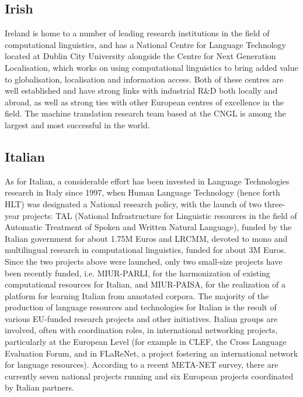 \documentclass[10pt, plain]{../../metanetpaper}
\begin{document}
\begin{multicols}{2}
\begin{small}
\subsection*{Irish}
\label{sec:irish}

Ireland is home to a number of leading research institutions in the field of computational linguistics, and has a National Centre for Language Technology located at Dublin City University alongside the Centre for Next Generation Localisation, which works on using computational linguistics to bring added value to globalisation, localisation and information access. Both of these centres are well established and have strong links with industrial R\&D both locally and abroad, as well as strong ties with other European centres of excellence in the field. The machine translation research team based at the CNGL is among the largest and most successful in the world. 


\subsection*{Italian}
\label{sec:italian}

As for Italian, a considerable effort has been invested in Language Technologies research in Italy since 1997, when Human Language Technology (hence forth HLT) was designated a National research policy, with the launch of two three-year projects: TAL (National Infrastructure for Linguistic resources in the field of Automatic Treatment of Spoken and Written Natural Language), funded by the Italian government for about 1.75M Euros and LRCMM, devoted to mono and multilingual research in computational linguistics, funded for about 3M Euros. Since the two projects above were launched, only two small-size projects have been recently funded, i.e. MIUR-PARLI, for the harmonization of existing computational resources for Italian, and MIUR-PAISA, for the realization of a platform for learning Italian from annotated corpora. The majority of the production of language resources and technologies for Italian is the result of various EU-funded research projects and other initiatives. Italian groups are involved, often with coordination roles, in international networking projects, particularly at the European Level (for example in CLEF, the Cross Language Evaluation Forum, and in FLaReNet, a project fostering an international network for language resources). According to a recent META-NET survey, there are currently seven national projects running and six European projects coordinated by Italian partners.


\end{small}
\end{multicols}
\end{document}
